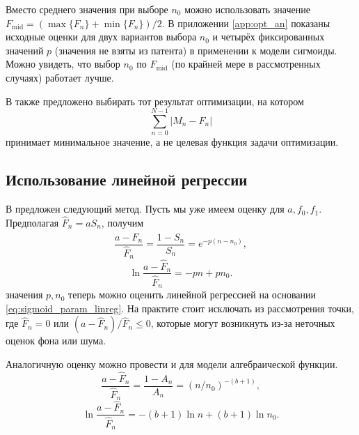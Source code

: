 Вместо среднего значения при выборе $n_0$ можно использовать значение
$F_{\text{mid}}=(\max\{F_{n}\}+\min\{F_{n}\})/2$. В приложении
\ref{app:opt_an} показаны исходные оценки для двух вариантов выбора $n_0$ и
четырёх фиксированных значений $p$ (значения не взяты из патента) в применении
к модели сигмоиды. Можно увидеть, что выбор $n_0$ по $F_{\text{mid}}$ (по
крайней мере в рассмотренных случаях) работает лучше.

В \cite{kurnikPCRElbowDetermination2011} также предложено выбирать тот
результат оптимизации, на котором
\[
  \sum_{n=0}^{N-1}|M_{n}-F_{n}|
\]
принимает минимальное значение, а не целевая функция задачи оптимизации.

\subsection{Использование линейной регрессии}\label{ssec:linreg_improve}

В \cite{liuProgressCurveAnalysis2011,goudarRobustParameterEstimation2009}
предложен следующий метод. Пусть мы уже имеем оценку для $a,f_0,f_1$.
Предполагая $\hat F_{n}=aS_{n}$, получим
\[
  \frac{a-\hat F_{n}}{\hat F_{n}}=\frac{1-S_{n}}{S_{n}}=e^{-p(n-n_0)},
\]
\begin{equation}\label{eq:sigmoid_param_linreg}
  \ln\frac{a-\hat F_{n}}{\hat F_{n}}=-pn + pn_0.
\end{equation}
значения $p,n_0$ теперь можно оценить линейной регрессией на основании
\eqref{eq:sigmoid_param_linreg}. На практите стоит исключать из рассмотрения
точки, где $\hat F_{n}=0$ или $(a-\hat F_{n})/\hat F_{n}\leq 0$, которые могут
возникнуть из-за неточных оценок фона или шума.

Аналогичную оценку можно провести и для модели алгебраической функции.
\[
  \frac{a-\hat F_{n}}{\hat F_{n}}=\frac{1-A_{n}}{A_{n}}=(n/n_0)^{-(b+1)},
\]
\[
  \ln\frac{a-\hat F_{n}}{\hat F_{n}}=-(b+1)\ln n+(b+1)\ln n_0.
\]

